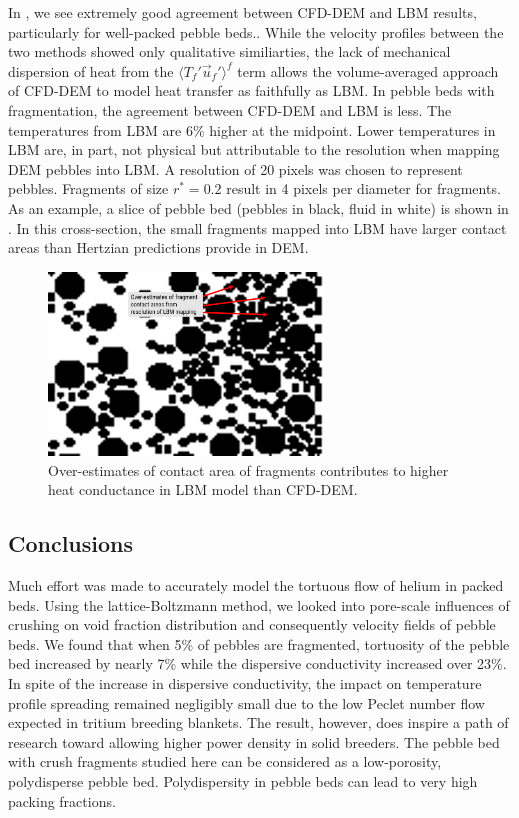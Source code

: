 In , we see extremely good agreement between CFD-DEM and LBM results, particularly for well-packed pebble beds.. While the velocity profiles between the two methods showed only qualitative similiarties, the lack of mechanical dispersion of heat from the $\langle T_f' \vec{u}_f'\rangle^f$ term allows the volume-averaged approach of CFD-DEM to model heat transfer as faithfully as LBM. In pebble beds with fragmentation, the agreement between CFD-DEM and LBM is less. The temperatures from LBM are 6\% higher at the midpoint. Lower temperatures in LBM are, in part, not physical but attributable to the resolution when mapping DEM pebbles into LBM. A resolution of 20 pixels was chosen to represent pebbles. Fragments of size $r^* = 0.2$ result in 4 pixels per diameter for fragments. As an example, a slice of pebble bed (pebbles in black, fluid in white) is shown in . In this cross-section, the small fragments mapped into LBM have larger contact areas than Hertzian predictions provide in DEM. 

\begin{figure}[!t]
    \centering
    \includegraphics[width = 0.65\textwidth]{figures/lbm/fragment-contact-resolution}
    \caption{Over-estimates of contact area of fragments contributes to higher heat conductance in LBM model than CFD-DEM.}\label{fig:lbm-fragment-contact-area}
\end{figure}






\FloatBarrier

\subsection{Conclusions}
Much effort was made to accurately model the tortuous flow of helium in packed beds. Using the lattice-Boltzmann method, we looked into pore-scale influences of crushing on void fraction distribution and consequently velocity fields of pebble beds. We found that when 5\% of pebbles are fragmented, tortuosity of the pebble bed increased by nearly 7\% while the dispersive conductivity increased over 23\%. In spite of the increase in dispersive conductivity, the impact on temperature profile spreading remained negligibly small due to the low Peclet number flow expected in tritium breeding blankets. The result, however, does inspire a path of research toward allowing higher power density in solid breeders. The pebble bed with crush fragments studied here can be considered as a low-porosity, polydisperse pebble bed. Polydispersity in pebble beds can lead to very high packing fractions.

